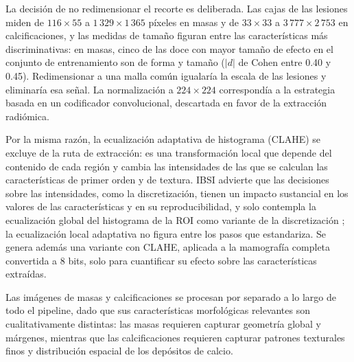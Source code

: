 La decisión de no redimensionar el recorte es deliberada. Las cajas de las lesiones miden de
\(116\times55\) a \(1\,329\times1\,365\) píxeles en masas y de \(33\times33\) a \(3\,777\times2\,753\)
en calcificaciones, y las medidas de tamaño figuran entre las características más discriminativas:
en masas, cinco de las doce con mayor tamaño de efecto en el conjunto de entrenamiento son de forma
y tamaño (\(|d|\) de Cohen entre 0.40 y 0.45). Redimensionar a una malla común igualaría la escala de
las lesiones y eliminaría esa señal. La normalización a \(224\times224\) correspondía a la estrategia
basada en un codificador convolucional, descartada en favor de la extracción radiómica.

Por la misma razón, la ecualización adaptativa de histograma (CLAHE) \cite{reza2004realization} se excluye de la ruta de
extracción: es una transformación local que depende del contenido de cada región y cambia las intensidades
de las que se calculan las características de primer orden y de textura. IBSI advierte que las decisiones
sobre las intensidades, como la discretización, tienen un impacto sustancial en los valores de las
características y en su reproducibilidad, y solo contempla la ecualización global del histograma de la ROI
como variante de la discretización \cite{Zwanenburg2020IBSI}; la ecualización local adaptativa no figura
entre los pasos que estandariza. Se genera además una variante con CLAHE, aplicada a la mamografía completa convertida a 8 bits, solo para
cuantificar su efecto sobre las características extraídas.

Las imágenes de masas y calcificaciones se procesan por
separado a lo largo de todo el pipeline, dado que sus
características morfológicas relevantes son
cualitativamente distintas: las masas requieren capturar
geometría global y márgenes, mientras que las
calcificaciones requieren capturar patrones texturales
finos y distribución espacial de los depósitos de calcio.
